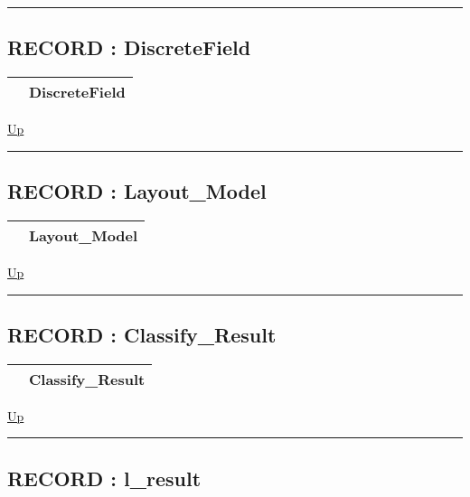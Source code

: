 \rule{\textwidth}{0.4pt}
\subsection*{RECORD : DiscreteField}
\hypertarget{ecldoc:ml_core.types.discretefield}{}

{\renewcommand{\arraystretch}{1.5}
\begin{tabularx}{\textwidth}{|>{\raggedright\arraybackslash}l|X|}
\hline
\hspace{0pt} & DiscreteField \\
\hline
\end{tabularx}
}

\hyperlink{ecldoc:ML_Core.Types}{Up}

\par


\rule{\textwidth}{0.4pt}
\subsection*{RECORD : Layout\_Model}
\hypertarget{ecldoc:ml_core.types.layout_model}{}

{\renewcommand{\arraystretch}{1.5}
\begin{tabularx}{\textwidth}{|>{\raggedright\arraybackslash}l|X|}
\hline
\hspace{0pt} & Layout\_Model \\
\hline
\end{tabularx}
}

\hyperlink{ecldoc:ML_Core.Types}{Up}

\par


\rule{\textwidth}{0.4pt}
\subsection*{RECORD : Classify\_Result}
\hypertarget{ecldoc:ml_core.types.classify_result}{}

{\renewcommand{\arraystretch}{1.5}
\begin{tabularx}{\textwidth}{|>{\raggedright\arraybackslash}l|X|}
\hline
\hspace{0pt} & Classify\_Result \\
\hline
\end{tabularx}
}

\hyperlink{ecldoc:ML_Core.Types}{Up}

\par


\rule{\textwidth}{0.4pt}
\subsection*{RECORD : l\_result}
\hypertarget{ecldoc:ml_core.types.l_result}{}


